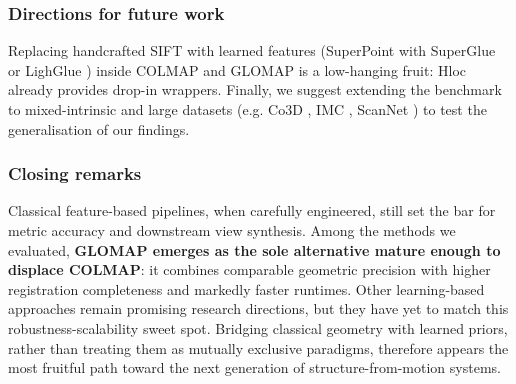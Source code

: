 \subsubsection{Directions for future work}
Replacing handcrafted SIFT with learned features (SuperPoint \cite{detone18superpoint} with SuperGlue \cite{sarlin2020superglue} or LighGlue \cite{lindenberger2023lightglue}) inside COLMAP and GLOMAP is a low-hanging fruit: Hloc already provides drop-in wrappers.
Finally, we suggest extending the benchmark to mixed-intrinsic and large datasets (e.g. Co3D \cite{reizenstein21co3d}, IMC \cite{Jin2020}, ScanNet \cite{dai2017scannet}) to test the generalisation of our findings.

\subsubsection{Closing remarks}
Classical feature-based pipelines, when carefully engineered, still set the bar for metric accuracy and downstream view synthesis.  
Among the methods we evaluated, \textbf{GLOMAP emerges as the sole alternative mature enough to displace COLMAP}: it combines comparable geometric precision with higher registration completeness and markedly faster runtimes.  
Other learning-based approaches remain promising research directions, but they have yet to match this robustness-scalability sweet spot.  
Bridging classical geometry with learned priors, rather than treating them as mutually exclusive paradigms, therefore appears the most fruitful path toward the next generation of structure-from-motion systems.
